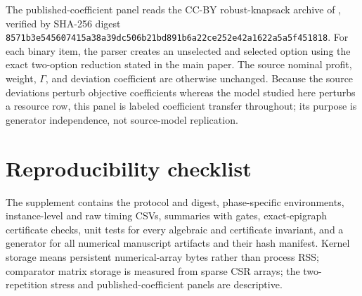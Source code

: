 \documentclass[11pt]{article}
\theoremstyle{plain}
\theoremstyle{definition}
\theoremstyle{remark}
\begin{document}
The published-coefficient panel reads the CC-BY robust-knapsack archive of \citet{GersingData2022}, verified by SHA-256 digest \nolinkurl{8571b3e545607415a38a39dc506b21bd891b6a22ce252e42a1622a5a5f451818}.  For each binary item, the parser creates an unselected and selected option using the exact two-option reduction stated in the main paper.  The source nominal profit, weight, $\Gamma$, and deviation coefficient are otherwise unchanged.  Because the source deviations perturb objective coefficients whereas the model studied here perturbs a resource row, this panel is labeled coefficient transfer throughout; its purpose is generator independence, not source-model replication.

\begin{center}
\centering
{}
\label{tab:external}
\small

\end{center}

\section{Reproducibility checklist}\label{app:reproducibility}

The supplement contains the protocol and digest, phase-specific environments, instance-level and raw timing CSVs, summaries with gates, exact-epigraph certificate checks, unit tests for every algebraic and certificate invariant, and a generator for all numerical manuscript artifacts and their hash manifest.  Kernel storage means persistent numerical-array bytes rather than process RSS; comparator matrix storage is measured from sparse CSR arrays; the two-repetition stress and published-coefficient panels are descriptive.

\fi
\end{document}
